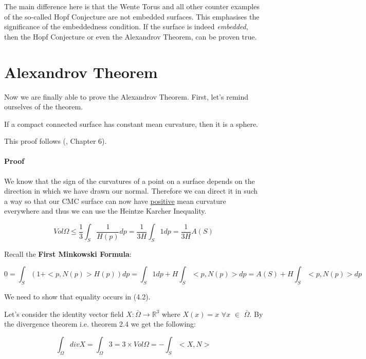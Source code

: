 \documentclass[a4paper,12pt]{report}
\begin{document}
\hspace{-0.7cm}The main difference here is that the Wente Torus and all other counter examples of the so-called Hopf Conjecture are not embedded surfaces. This emphasises the significance of the embeddedness condition. If the surface is indeed \textit{embedded}, then the Hopf Conjecture or even the Alexandrov Theorem, can be proven true.

\section{Alexandrov Theorem}

Now we are finally able to prove the Alexandrov Theorem. First, let's remind ourselves of the theorem.

\begin{theorem}
If a compact connected surface has constant mean curvature, then it is a sphere.
\end{theorem}

This proof follows (\cite{montiel}, Chapter 6).

\paragraph{Proof} We know that the sign of the curvatures of a point on a surface depends on the direction in which we have drawn our normal. Therefore we can direct it in such a way so that our CMC surface can now have \underline{positive} mean curvature everywhere and thus we can use the Heintze Karcher Inequality.

\begin{equation}
Vol\Omega \leq \frac{1}{3}\int_{S} \frac{1}{H(p)}dp = \frac{1}{3H}\int_{S} 1 dp = \frac{1}{3H}A(S)
\end{equation}


Recall the \textbf{First Minkowski Formula}:

\[
0 = \int_{S} (1+<p,N(p)>H(p))dp = \int_{S} 1 dp + H\int_{S} <p,N(p)> dp = A(S) + H\int_{S} <p,N(p)> dp
\]

We need to show that equality occurs in (4.2).\par 
Let's consider the identity vector field $X: \bar{\Omega} \rightarrow \mathbb{R}^{3}$ where $X(x) = x$ $\forall x$ $\in$ $\bar{\Omega}$. By the divergence theorem i.e. theorem 2.4 we get the following:

\[
\int_{\Omega} div X = \int_{\Omega} 3 = 3 \times Vol\Omega = - \int_{S} <X,N> 
\]
\end{document}
